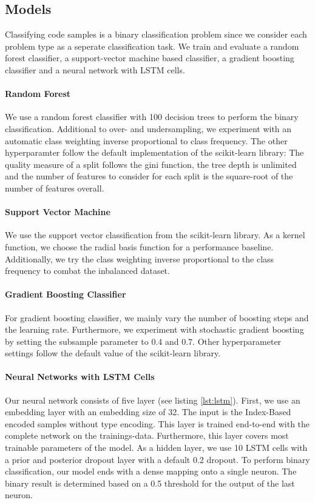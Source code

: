\subsection{Models}
Classifying code samples is a binary classification problem since we consider each problem type as a seperate classification task. We train and evaluate a random forest classifier, a support-vector machine based classifier, a gradient boosting classifier and a neural network with LSTM cells.

\paragraph{Random Forest}
We use a random forest classifier with 100 decision trees to perform the binary classification. Additional to over- and undersampling, we experiment with an automatic class weighting inverse proportional to class frequency. The other hyperparamter follow the default implementation of the scikit-learn library: The quality measure of a split follows the gini function, the tree depth is unlimited and the number of features to consider for each split is the square-root of the number of features overall.
\paragraph{Support Vector Machine}
We use the support vector classification from the scikit-learn library. As a kernel function, we choose the radial basis function for a performance baseline. Additionally, we try the class weighting inverse proportional to the class frequency to combat the inbalanced dataset.
\paragraph{Gradient Boosting Classifier}
For gradient boosting classifier, we mainly vary the number of boosting steps and the learning rate. Furthermore, we experiment with stochastic gradient boosting by setting the subsample parameter to 0.4 and 0.7. Other hyperparameter settings follow the default value of the scikit-learn library.
\paragraph{Neural Networks with LSTM Cells}
Our neural network consists of five layer (see listing \ref{lst:lstm}). First, we use an embedding layer with an embedding size of 32. The input is the Index-Based encoded samples without type encoding. This layer is trained end-to-end with the complete network on the trainings-data. Furthermore, this layer covers most trainable parameters of the model. As a hidden layer, we use 10 LSTM cells with a prior and posterior dropout layer with a default 0.2 dropout. To perform binary classification, our model ends with a dense mapping onto a single neuron. The binary result is determined based on a 0.5 threshold for the output of the last neuron.

